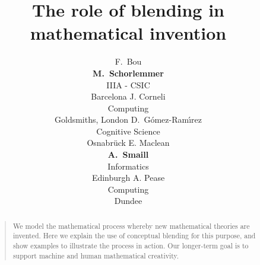 \documentclass[letterpaper]{article}
\title{The role of blending in mathematical invention}
\author{F.\ Bou \\ \Large{\textbf{M.\ Schorlemmer}}\\IIIA - CSIC \\ Barcelona
        \And J. Corneli \\Computing \\Goldsmiths, London
        \And D.\ G{\'o}mez-Ram{\'{\i}}rez\\Cognitive Science \\Osnabr{\"u}ck
        \And E. Maclean \\\Large{\textbf{A.\ Smaill}}\\ Informatics\\ Edinburgh
        \And A. Pease \\ Computing \\ Dundee}
\begin{document}
 
\maketitle
\begin{abstract}
\begin{quote}
  We model the mathematical process whereby new mathematical theories
  are invented.  Here we
  explain the use of conceptual blending for this purpose, and show
  examples to illustrate the process in action.  Our longer-term goal
  is to support machine and human mathematical creativity.
\end{quote}
\end{abstract}










\nocite{Weil60}
\nocite{nunez05}
\nocite{Lak00}
\nocite{Gog05,Gog99}

\printbibliography
\end{document}
